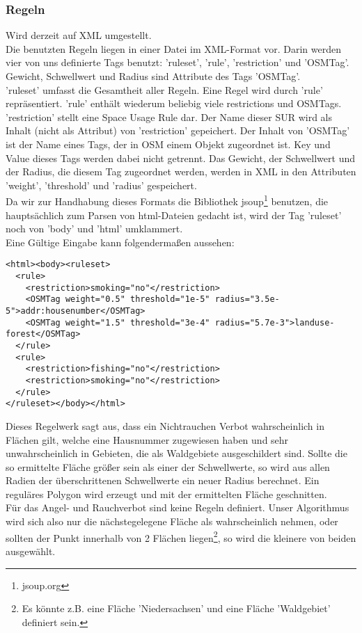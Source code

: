 \subsubsection{Regeln}
Wird derzeit auf XML umgestellt.\\
\label{sec:Eingabedaten_Wir}
Die benutzten Regeln liegen in einer Datei im XML-Format vor. Darin werden vier von uns definierte Tags benutzt: 'ruleset', 'rule',
'restriction' und 'OSMTag'. Gewicht, Schwellwert und Radius sind Attribute des Tags 'OSMTag'.\\
'ruleset' umfasst die Gesamtheit aller Regeln. Eine Regel wird durch 'rule' repräsentiert. 'rule' enthält wiederum beliebig viele 
restrictions und OSMTags. 'restriction' stellt eine Space Usage Rule dar. Der Name dieser SUR wird als Inhalt (nicht als Attribut) 
von 'restriction' gepeichert. Der Inhalt von 'OSMTag' ist der Name eines Tags, der in OSM einem Objekt zugeordnet ist. Key und Value
dieses Tags werden dabei nicht getrennt. Das Gewicht, der Schwellwert und der Radius, die diesem Tag zugeordnet werden, werden in XML
in den Attributen 'weight', 'threshold' und 'radius' gespeichert.\\
Da wir zur Handhabung dieses Formats die Bibliothek jsoup\footnote{jsoup.org} benutzen, die hauptsächlich zum Parsen von html-Dateien
gedacht ist, wird der Tag 'ruleset' noch von 'body' und 'html' umklammert.\\
Eine Gültige Eingabe kann folgendermaßen aussehen:
\begin{lstlisting}[frame=single]
<html><body><ruleset>
  <rule>
    <restriction>smoking="no"</restriction>
    <OSMTag weight="0.5" threshold="1e-5" radius="3.5e-5">addr:housenumber</OSMTag>
    <OSMTag weight="1.5" threshold="3e-4" radius="5.7e-3">landuse-forest</OSMTag>
  </rule>
  <rule>
    <restriction>fishing="no"</restriction>
    <restriction>smoking="no"</restriction>
  </rule>
</ruleset></body></html>
\end{lstlisting}
Dieses Regelwerk sagt aus, dass ein Nichtrauchen Verbot wahrscheinlich in Flächen gilt, welche eine Hausnummer zugewiesen haben
und sehr unwahrscheinlich in Gebieten, die als Waldgebiete ausgeschildert sind. Sollte die so ermittelte Fläche größer sein als 
einer der Schwellwerte, so wird aus allen Radien der überschrittenen Schwellwerte ein neuer Radius berechnet. Ein reguläres Polygon
wird erzeugt und mit der ermittelten Fläche geschnitten.\\
Für das Angel- und Rauchverbot sind keine Regeln definiert. Unser Algorithmus wird sich also nur die nächstegelegene Fläche als wahrscheinlich nehmen,
oder sollten der Punkt innerhalb von 2 Flächen liegen\footnote{Es könnte z.B. eine Fläche 'Niedersachsen' und eine Fläche 'Waldgebiet' definiert sein.},
so wird die kleinere von beiden ausgewählt.

